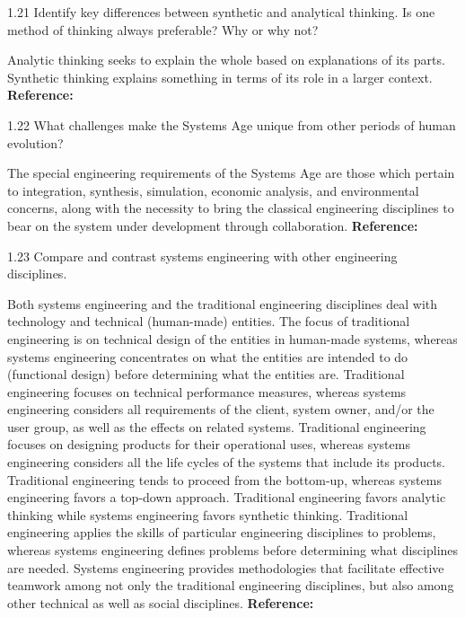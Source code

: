 \begin{exsol@exercise}{1.21}
    \label{sea-1-28}
        Identify key differences between synthetic and analytical thinking. Is one method of thinking always preferable? Why or why not?
\end{exsol@exercise}
\begin{exsol@solution}{}
        Analytic thinking seeks to explain the whole based on explanations of its parts. Synthetic thinking explains something in terms of its role in a larger context. \textbf{Reference:}
\end{exsol@solution}
\begin{exsol@exercise}{1.22}
    \label{sea-1-29}
        What challenges make the Systems Age unique from other periods of human evolution?
\end{exsol@exercise}
\begin{exsol@solution}{}
        The special engineering requirements of the Systems Age are those which pertain to integration, synthesis, simulation, economic analysis, and environmental concerns, along with the necessity to bring the classical engineering disciplines to bear on the system under development through collaboration. \textbf{Reference:}
\end{exsol@solution}
\begin{exsol@exercise}{1.23}
    \label{sea-1-30}
        Compare and contrast systems engineering with other engineering disciplines.
\end{exsol@exercise}
\begin{exsol@solution}{}
        Both systems engineering and the traditional engineering disciplines deal with technology and technical (human-made) entities. The focus of traditional engineering is on technical design of the entities in human-made systems, whereas systems engineering concentrates on what the entities are intended to do (functional design) before determining what the entities are. Traditional engineering focuses on technical performance measures, whereas systems engineering considers all requirements of the client, system owner, and/or the user group, as well as the effects on related systems. Traditional engineering focuses on designing products for their operational uses, whereas systems engineering considers all the life cycles of the systems that include its products. Traditional engineering tends to proceed from the bottom-up, whereas systems engineering favors a top-down approach. Traditional engineering favors analytic thinking while systems engineering favors synthetic thinking. Traditional engineering applies the skills of particular engineering disciplines to problems, whereas systems engineering defines problems before determining what disciplines are needed. Systems engineering provides methodologies that facilitate effective teamwork among not only the traditional engineering disciplines, but also among other technical as well as social disciplines. \textbf{Reference:}
\end{exsol@solution}
